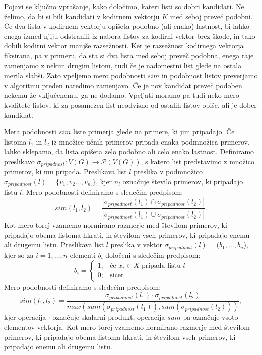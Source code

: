 \documentclass[12pt,a4paper]{article}
\begin{document}
Pojavi se ključno vprašanje, kako določimo, kateri listi so dobri kandidati. Ne želimo, da bi si bili kandidati v kodirnem vektorju $K$ med seboj preveč podobni. 
Če dva lista v kodirnem vektorju opišeta podobno (ali enako) lastnost, bi lahko enega izmed njiju odstranili iz nabora listov za kodirni vektor brez škode, in tako dobili kodirni vektor manjše razsežnosti. 
Ker je razsežnost kodirnega vektorja fiksirana, pa v primeru, da sta si dva lista med seboj preveč podobna, enega raje zamenjamo z nekim drugim listom, tudi če je nadomestni list glede na ostala merila slabši.
Zato vpeljemo mero podobnosti $sim$ in podobnost listov preverjamo v algoritmu preden naredimo zamenjavo. Če je nov kandidat preveč podoben nekemu že vključenemu, ga ne dodamo.
Vpeljati moramo pa tudi neko mero kvalitete listov, ki za posamezen list neodvisno od ostalih listov opiše, ali je dober kandidat.

Mera podobnosti $sim$ liste primerja glede na primere, ki jim pripadajo. 
Če listoma $l_1$ in $l_2$ iz množice učnih primerov pripada enaka podmnožica primerov, lahko sklepamo, da lista opišeta zelo podobno ali celo enako lastnost.
Definiramo preslikavo $\sigma_{\mathit{pripadnost}}: V(G) \rightarrow \mathcal{P}(V(G))$, s katero list predstavimo z množico primerov, ki mu pripada.
Preslikava list $l$ preslika v podmnožico $\sigma_{\mathit{pripadnost}}(l) = \{v_1,v_2\ldots,v_{n_l}\}$, kjer $n_l$ označuje število primerov, ki pripadajo listu $l$.
Mero podobnosti definiramo s sledečim predpisom:
\[
	sim(l_1, l_2) = \frac{|\sigma_{pripadnost}(l_1) \cap \sigma_{pripadnost}(l_2)|}{|\sigma_{pripadnost}(l_1) \cup \sigma_{pripadnost}(l_2)|}.
\]
Kot mero torej vzamemo normirano razmerje med številom primerov, ki pripadajo obema listoma hkrati, in številom vseh primerov, ki pripadajo enemu ali drugemu listu.
Preslikava list $l$ preslika v vektor $\sigma_{pripadnost}(l) = (b_1,\ldots, b_n$), kjer so za $i=1,\ldots,n$ elementi $b_i$ določeni s sledečim predpisom:
$$
b_i =
\begin{cases}
	1 ;& \text{če $x_i \in X$ pripada listu $l$} \\
	0 ;& \text{sicer}
\end{cases}
$$
Mero podobnosti definiramo s sledečim predpisom:
$$
sim(l_1, l_2) = \frac{\sigma_{pripadnost}(l_1) \cdot \sigma_{pripadnost}(l_2)}{max(sum(\sigma_{pripadnost}(l_1)), sum(\sigma_{pripadnost}(l_2)))},
$$
kjer operacija $\cdot$ označuje skalarni produkt, operacija $sum$ pa označuje vsoto elementov vektorja.
Kot mero torej vzamemo normirano razmerje med številom primerov, ki pripadajo obema listoma hkrati, in številom vseh primerov, ki pripadajo enemu ali drugemu listu.
\end{document}
